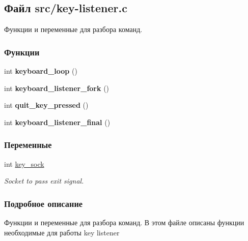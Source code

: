 \hypertarget{key-listener_8c}{\subsection{Файл src/key-\/listener.c}
\label{key-listener_8c}
}


Функции и переменные для разбора команд.  


\subsubsection*{Функции}
\begin{DoxyCompactItemize}
\item 
\hypertarget{key-listener_8c_a83385f91069b8e1949d0360674ad3240}{int {\bfseries keyboard\-\_\-loop} ()}\label{key-listener_8c_a83385f91069b8e1949d0360674ad3240}

\item 
\hypertarget{key-listener_8c_afce84267d242a67489ca201c43c8cae6}{int {\bfseries keyboard\-\_\-listener\-\_\-fork} ()}\label{key-listener_8c_afce84267d242a67489ca201c43c8cae6}

\item 
\hypertarget{key-listener_8c_a25d43c3904f4a26b458c753fd7d83c26}{int {\bfseries quit\-\_\-key\-\_\-pressed} ()}\label{key-listener_8c_a25d43c3904f4a26b458c753fd7d83c26}

\item 
\hypertarget{key-listener_8c_a0542378d05d3c52577c6f23db16bea6b}{int {\bfseries keyboard\-\_\-listener\-\_\-final} ()}\label{key-listener_8c_a0542378d05d3c52577c6f23db16bea6b}

\end{DoxyCompactItemize}
\subsubsection*{Переменные}
\begin{DoxyCompactItemize}
\item 
\hypertarget{key-listener_8c_ac4a5c4cd6cd657b224681ccdb051bee7}{int \hyperlink{key-listener_8c_ac4a5c4cd6cd657b224681ccdb051bee7}{key\-\_\-sock}}\label{key-listener_8c_ac4a5c4cd6cd657b224681ccdb051bee7}

\begin{DoxyCompactList}\small\item\em Socket to pass exit signal. \end{DoxyCompactList}\end{DoxyCompactItemize}


\subsubsection{Подробное описание}
Функции и переменные для разбора команд. В этом файле описаны функции необходимые для работы key listener 
